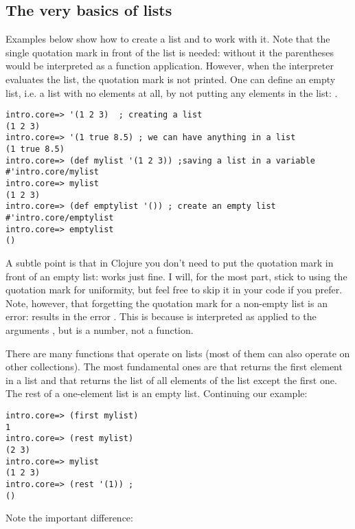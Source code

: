 \subsection{The very basics of lists}\label{subsec:lists}
Examples below show how to create a list and to work with it. Note that the single quotation mark in front of the list is needed: without it the parentheses would be interpreted as a function application. However, when the interpreter evaluates the list, the quotation mark is not printed. One can define an empty list, i.e. a list with no elements at all, by not putting any elements in the list: .
\begin{framed}
\begin{verbatim}
intro.core=> '(1 2 3)  ; creating a list
(1 2 3)
intro.core=> '(1 true 8.5) ; we can have anything in a list
(1 true 8.5)
intro.core=> (def mylist '(1 2 3)) ;saving a list in a variable
#'intro.core/mylist
intro.core=> mylist
(1 2 3)
intro.core=> (def emptylist '()) ; create an empty list
#'intro.core/emptylist
intro.core=> emptylist
()
\end{verbatim}
\end{framed}
A subtle point is that in Clojure you don't need to put the quotation mark in front of an empty list:  works just fine. I will, for the most part, stick to using the quotation mark for uniformity, but feel free to skip it in your code if you prefer. Note, however, that forgetting the quotation mark for a non-empty list is an error:  results in the error . This is because  is interpreted as  applied to the arguments , but  is a number, not a function. 

There are many functions that operate on lists (most of them can also operate on other collections). The most fundamental ones are  that returns the first element in a list and  that returns the list of all elements of the list except the first one. The rest of a one-element list is an empty list. Continuing our example: 
\begin{framed}
\begin{verbatim}
intro.core=> (first mylist)
1
intro.core=> (rest mylist)
(2 3)
intro.core=> mylist
(1 2 3)
intro.core=> (rest '(1)) ; 
()
\end{verbatim}
\end{framed}
Note the important difference:  

